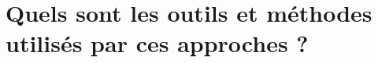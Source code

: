 \documentclass[12pt,a4paper,oneside]{report}
\begin{document}

\section{Quels sont les outils et méthodes utilisés par ces approches ?}
\label{sec:outils}
\end{document}
